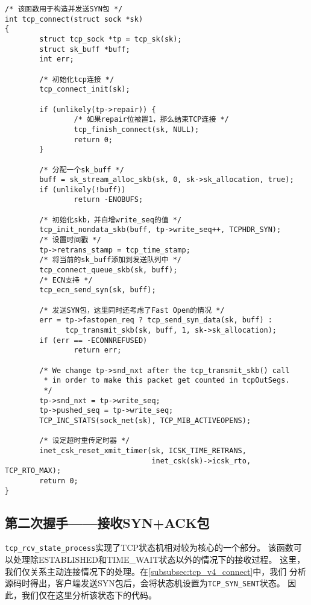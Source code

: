 \begin{verbatim}
/* 该函数用于构造并发送SYN包 */
int tcp_connect(struct sock *sk)
{
        struct tcp_sock *tp = tcp_sk(sk);
        struct sk_buff *buff;
        int err;

        /* 初始化tcp连接 */
        tcp_connect_init(sk);

        if (unlikely(tp->repair)) {
                /* 如果repair位被置1，那么结束TCP连接 */
                tcp_finish_connect(sk, NULL);
                return 0;
        }

        /* 分配一个sk_buff */
        buff = sk_stream_alloc_skb(sk, 0, sk->sk_allocation, true);
        if (unlikely(!buff))
                return -ENOBUFS;

        /* 初始化skb，并自增write_seq的值 */
        tcp_init_nondata_skb(buff, tp->write_seq++, TCPHDR_SYN);
        /* 设置时间戳 */
        tp->retrans_stamp = tcp_time_stamp;
        /* 将当前的sk_buff添加到发送队列中 */
        tcp_connect_queue_skb(sk, buff);
        /* ECN支持 */
        tcp_ecn_send_syn(sk, buff);

        /* 发送SYN包，这里同时还考虑了Fast Open的情况 */
        err = tp->fastopen_req ? tcp_send_syn_data(sk, buff) :
              tcp_transmit_skb(sk, buff, 1, sk->sk_allocation);
        if (err == -ECONNREFUSED)
                return err;

        /* We change tp->snd_nxt after the tcp_transmit_skb() call
         * in order to make this packet get counted in tcpOutSegs.
         */
        tp->snd_nxt = tp->write_seq;
        tp->pushed_seq = tp->write_seq;
        TCP_INC_STATS(sock_net(sk), TCP_MIB_ACTIVEOPENS);

        /* 设定超时重传定时器 */
        inet_csk_reset_xmit_timer(sk, ICSK_TIME_RETRANS,
                                  inet_csk(sk)->icsk_rto, TCP_RTO_MAX);
        return 0;
}
\end{verbatim}

\subsection{第二次握手——接收SYN+ACK包}
\label{subsec:recv_synack}
\texttt{tcp_rcv_state_process}实现了TCP状态机相对较为核心的一个部分。
该函数可以处理除ESTABLISHED和TIME\_WAIT状态以外的情况下的接收过程。
这里，我们仅关系主动连接情况下的处理。在\ref{subsubsec:tcp_v4_connect}中，我们
分析源码时得出，客户端发送SYN包后，会将状态机设置为\texttt{TCP_SYN_SENT}状态。
因此，我们仅在这里分析该状态下的代码。

